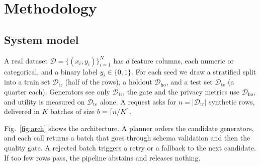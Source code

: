 \documentclass[journal]{IEEEtran}
\begin{document}
\section{Methodology}
\label{sec:method}

\subsection{System model}
A real dataset $\mathcal{D}=\{(x_i,y_i)\}_{i=1}^{N}$ has $d$ feature columns, each numeric or categorical, and a binary label $y_i\in\{0,1\}$. For each seed we draw a stratified split into a train set $\mathcal{D}_{\mathrm{tr}}$ (half of the rows), a holdout $\mathcal{D}_{\mathrm{ho}}$, and a test set $\mathcal{D}_{\mathrm{te}}$ (a quarter each). Generators see only $\mathcal{D}_{\mathrm{tr}}$, the gate and the privacy metrics use $\mathcal{D}_{\mathrm{ho}}$, and utility is measured on $\mathcal{D}_{\mathrm{te}}$ alone. A request asks for $n=|\mathcal{D}_{\mathrm{tr}}|$ synthetic rows, delivered in $K$ batches of size $b=\lceil n/K\rceil$.

Fig.~\ref{fig:arch} shows the architecture. A planner orders the candidate generators, and each call returns a batch that goes through schema validation and then the quality gate. A rejected batch triggers a retry or a fallback to the next candidate. If too few rows pass, the pipeline abstains and releases nothing.
\end{document}
